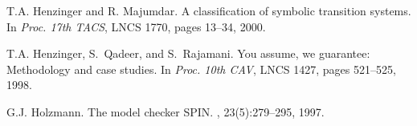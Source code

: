 \documentclass[10pt,twocolumn]{article}
\begin{document}
\begin{thebibliography}{10}
\vspace{-1mm}
T.A. Henzinger and R. Majumdar. 
\newblock A classification of symbolic transition systems. 
\newblock In {\em Proc. 17th TACS}, LNCS 1770, pages 13--34,  2000.

\vspace{-1mm}
T.A. Henzinger, S.~Qadeer, and S.~Rajamani.
\newblock You assume, we guarantee: Methodology and case studies.
\newblock In {\em Proc. 10th CAV},
  LNCS 1427, pages 521--525, 1998.

\vspace{-1mm}
G.J. Holzmann.
\newblock The model checker {SPIN}.
, 23(5):279--295, 1997.

\end{thebibliography}
\end{document}
